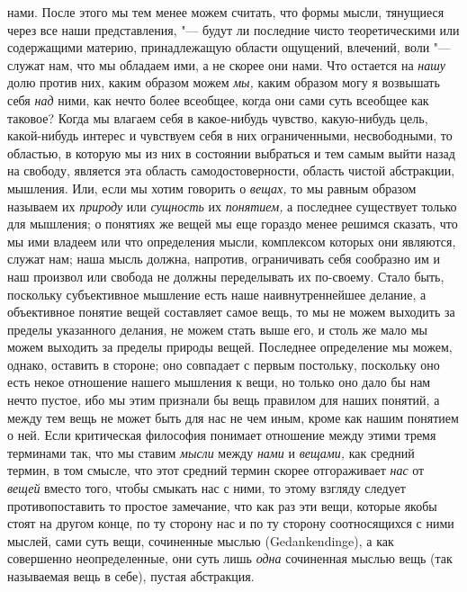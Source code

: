 нами. После этого мы тем менее можем считать, что формы мысли, тянущиеся через
все наши представления, "--- будут ли последние чисто теоретическими или
содержащими материю, принадлежащую области ощущений, влечений, воли "--- служат
нам, что мы обладаем ими, а не скорее они нами. Что остается на {\em нашу} долю
против них, каким образом можем {\em мы,} каким образом могу я возвышать себя
{\em над} ними, как нечто более всеобщее, когда они сами суть всеобщее как
таковое? Когда мы влагаем себя в какое-нибудь чувство, какую-нибудь цель,
какой-нибудь интерес и чувствуем себя в них ограниченными, несвободными, то
областью, в которую мы из них в состоянии выбраться и тем самым выйти назад на
свободу, является эта область самодостоверности, область чистой абстракции,
мышления. Или, если мы хотим говорить о {\em вещах,} то мы равным образом
называем их {\em природу} или {\em сущность} их {\em понятием,} а последнее
существует только для мышления; о понятиях же вещей мы еще гораздо менее
решимся сказать, что мы ими владеем или что определения мысли, комплексом
которых они являются, служат нам; наша мысль должна, напротив, ограничивать
себя сообразно им и наш произвол или свобода не должны переделывать их
по-своему. Стало быть, поскольку субъективное мышление есть наше
наивнутреннейшее делание, а объективное понятие вещей составляет самое вещь, то
мы не можем выходить за пределы указанного делания, не можем стать выше его, и
столь же мало мы можем выходить за пределы природы вещей. Последнее определение
мы можем, однако, оставить в стороне; оно совпадает с первым постольку,
поскольку оно есть некое отношение нашего мышления к вещи, но только оно дало
бы нам нечто пустое, ибо мы этим признали бы вещь правилом для наших понятий, а
между тем вещь не может быть для нас не чем иным, кроме как нашим понятием о
ней. Если критическая философия понимает отношение между этими тремя терминами
так, что мы ставим {\em мысли} между {\em нами} и {\em вещами,} как средний
термин, в том смысле, что этот средний термин скорее отгораживает {\em нас} от
{\em вещей} вместо того, чтобы смыкать нас с ними, то этому взгляду следует
противопоставить то простое замечание, что как раз эти вещи, которые якобы
стоят на другом конце, по ту сторону нас и по ту сторону соотносящихся с ними
мыслей, сами суть вещи, сочиненные мыслью (Gedank\-end\-inge), а как совершенно
неопределенные, они суть лишь {\em одна} сочиненная мыслью вещь (так называемая
вещь в себе), пустая абстракция.

